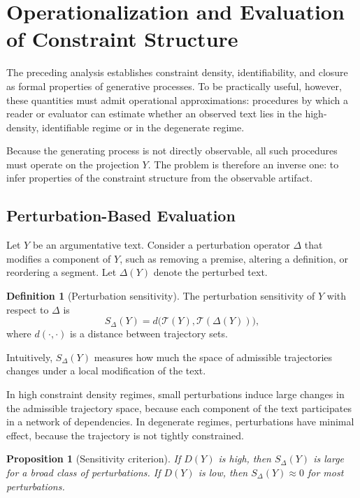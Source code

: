 \documentclass[12pt, oneside]{article}
\theoremstyle{plain}
\newtheorem{proposition}[theorem]{Proposition}
\theoremstyle{definition}
\newtheorem{definition}[theorem]{Definition}
\theoremstyle{remark}
\begin{document}
\section{Operationalization and Evaluation of Constraint Structure}

The preceding analysis establishes constraint density, identifiability, and closure
as formal properties of generative processes. To be practically useful, however,
these quantities must admit operational approximations: procedures by which a reader
or evaluator can estimate whether an observed text lies in the high-density,
identifiable regime or in the degenerate regime.

Because the generating process is not directly observable, all such procedures must
operate on the projection $Y$. The problem is therefore an inverse one: to infer
properties of the constraint structure from the observable artifact.

\subsection{Perturbation-Based Evaluation}

Let $Y$ be an argumentative text. Consider a perturbation operator $\Delta$ that
modifies a component of $Y$, such as removing a premise, altering a definition,
or reordering a segment. Let $\Delta(Y)$ denote the perturbed text.

\begin{definition}[Perturbation sensitivity]
The perturbation sensitivity of $Y$ with respect to $\Delta$ is
\[
  S_\Delta(Y) = d\bigl( \mathcal{T}(Y), \mathcal{T}(\Delta(Y)) \bigr),
\]
where $d(\cdot,\cdot)$ is a distance between trajectory sets.
\end{definition}

Intuitively, $S_\Delta(Y)$ measures how much the space of admissible trajectories
changes under a local modification of the text.

In high constraint density regimes, small perturbations induce large changes in the
admissible trajectory space, because each component of the text participates in a
network of dependencies. In degenerate regimes, perturbations have minimal effect,
because the trajectory is not tightly constrained.

\begin{proposition}[Sensitivity criterion]
If $D(Y)$ is high, then $S_\Delta(Y)$ is large for a broad class of perturbations.
If $D(Y)$ is low, then $S_\Delta(Y) \approx 0$ for most perturbations.
\end{proposition}
\end{document}
